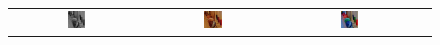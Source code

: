 \documentclass[10pt,twocolumn,letterpaper]{article}
\def\acollumsize{0.14\textwidth}
\begin{document}
\begin{figure}[t!]
\begin{center}
\small
\setlength{\tabcolsep}{2pt}
\begin{tabular}{ cccc }
\includegraphics[width=\acollumsize]{img/result/21_in.JPEG}&
\includegraphics[width=\acollumsize]{img/result/21.png}&
\includegraphics[width=\acollumsize]{img/result/21_gt.JPEG}& \\


\end{tabular}
\end{center}
\end{figure}
\end{document}
